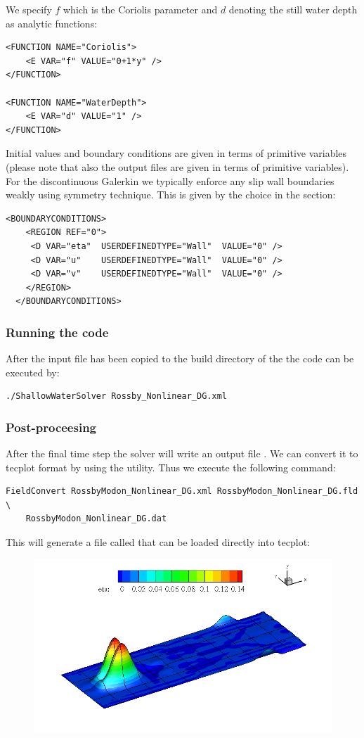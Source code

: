 We specify $f$ which is the Coriolis parameter and $d$ denoting the
still water depth as analytic functions:
\begin{lstlisting}[style=XmlStyle]
<FUNCTION NAME="Coriolis">
    <E VAR="f" VALUE="0+1*y" />
</FUNCTION>

<FUNCTION NAME="WaterDepth">
    <E VAR="d" VALUE="1" />
</FUNCTION>
\end{lstlisting}

Initial values and boundary conditions are given in terms of primitive variables
(please note that also the output files are given in terms of primitive
variables). For the discontinuous Galerkin we typically enforce any slip wall boundaries
weakly using symmetry technique. This is given by the
 choice in the 
section:
\begin{lstlisting}[style=XmlStyle]
  <BOUNDARYCONDITIONS>
    <REGION REF="0">
     <D VAR="eta"  USERDEFINEDTYPE="Wall"  VALUE="0" />
     <D VAR="u"    USERDEFINEDTYPE="Wall"  VALUE="0" />
     <D VAR="v"    USERDEFINEDTYPE="Wall"  VALUE="0" />
    </REGION>
  </BOUNDARYCONDITIONS>
\end{lstlisting}

\subsubsection{Running the code}

After the input file has been copied to the build directory
of the  the code can be executed by:
\begin{lstlisting}[style=BashInputStyle]
 ./ShallowWaterSolver Rossby_Nonlinear_DG.xml
\end{lstlisting}

\subsubsection{Post-proceesing}
After the final time step the solver will write an output file 
. We can convert it to tecplot
format by using the  utility. Thus we execute the
following command:
\begin{lstlisting}[style=BashInputStyle]
FieldConvert RossbyModon_Nonlinear_DG.xml RossbyModon_Nonlinear_DG.fld \
    RossbyModon_Nonlinear_DG.dat
\end{lstlisting}
This will generate a file called  that
can be loaded directly into tecplot:

\begin{figure}
\includegraphics[width=\linewidth]{img/RossbyModon.png}
\end{figure}
